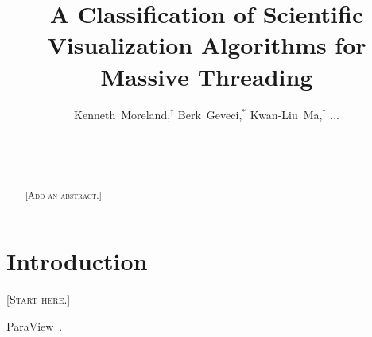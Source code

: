 \documentclass{sig-alternate}
\title{A Classification of Scientific Visualization Algorithms for Massive Threading}
\author{
  \alignauthor
  Kenneth~Moreland,$^{\ddagger}$ Berk~Geveci,$^*$ Kwan-Liu~Ma,$^{\dagger}$ ...\\
  \affaddr{$^{\ddagger}$Sandia National Laboratories}\\
  \affaddr{$^*$Kitware, Inc.}\\
  \affaddr{$^{\dagger}$University of California at Davis}\\
}
\newcommand*{\lcite}[1]{~\cite{#1}}
\newcommand{\fix}[1]{{\color{red}\textsc{[#1]}}}
\begin{document}
\maketitle

\begin{abstract}
\fix{Add an abstract.}
\end{abstract}

\section{Introduction}

\fix{Start here.}

ParaView\lcite{ParaView}.



\end{document}
